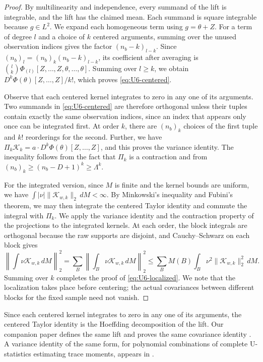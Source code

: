 \begin{proof}
By multilinearity and independence, every summand of the lift is
integrable, and the lift has the claimed mean. Each summand is square
integrable because $g\in L^2$. We expand each homogeneous term using $g=\theta+Z$.
For a term of degree $l$ and a choice of $k$ centered arguments,
summing over the unused observation indices gives the factor
$(n_b-k)_{l-k}$. Since
$(n_b)_l=(n_b)_k(n_b-k)_{l-k}$, its coefficient after averaging is
$\binom lk\Phi_{(l)}[Z,\dots,Z,\theta,\dots,\theta]$.
Summing over $l\ge k$, we obtain $D^k\Phi(\theta)[Z,\dots,Z]/k!$,
which proves \eqref{eq:U6-centered}.

Observe that each centered kernel integrates to zero in any one of
its arguments. Two summands in \eqref{eq:U6-centered} are therefore orthogonal
unless their tuples contain exactly the same observation indices,
since an index that appears only once can be integrated first.
At order $k$, there are $(n_b)_k$ choices of the first tuple and $k!$
reorderings for the second. Further, we have
$\Pi_k\mathcal K_k=a\cdot D^k\Phi(\theta)[Z,\dots,Z]$,
and this proves the variance identity. The inequality follows from the
fact that $\Pi_k$ is a contraction and from
$(n_b)_k\ge(n_b-D+1)^k\ge\Lambda^k$.

For the integrated version, since $M$ is finite and the kernel bounds
are uniform, we have $\int|\nu|\|\mathcal K_{w,k}\|_2\,dM<\infty$.
By Minkowski's inequality and Fubini's theorem, we may then integrate
the centered Taylor identity and commute the integral with $\Pi_k$. We
apply the variance identity and the contraction property of the
projections to the integrated kernels. At each order, the block
integrals are orthogonal because the raw supports are disjoint, and
Cauchy--Schwarz on each block gives
\[
 \left\|\int\nu\mathcal K_{w,k}\,dM\right\|_2^2
 =\sum_B\left\|\int_B\nu\mathcal K_{w,k}\,dM\right\|_2^2
 \le\sum_B M(B)\int_B\nu^2\|\mathcal K_{w,k}\|_2^2\,dM.
\]
Summing over $k$ completes the proof of \eqref{eq:U6-localized}. We
note that the localization takes place before centering; the actual
covariances between different blocks for the fixed sample need not
vanish.
\end{proof}

Since each centered kernel integrates to zero in any one of its
arguments, the centered Taylor identity is the Hoeffding decomposition
\cite{Hoeffding1948} of the lift. Our companion paper defines the same
lift and proves the same covariance identity
\cite[Section~4.3, Lemma~4.4]{AronowKallusLopatto2026}.
A variance identity of the same form, for polynomial combinations of
complete U-statistics estimating trace moments, appears in
\cite[Theorem~6.2]{Song2026}.
